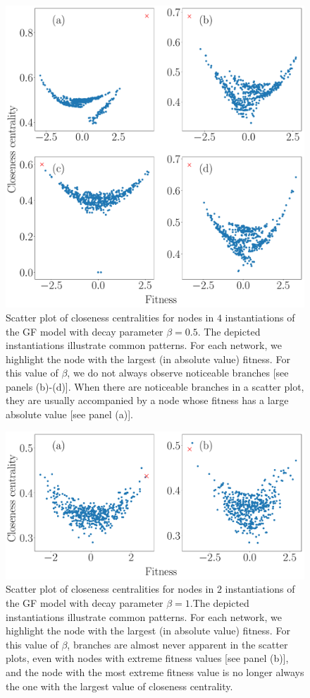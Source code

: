 \documentclass[%
 reprint,
 amsmath,amssymb,
 aps,
]{revtex4-1}
\begin{document}
\begin{figure}
    \centering
    \includegraphics[width=0.8\linewidth]{geographic_beta_05_examples_largerfont.pdf}
    \caption{Scatter plot of closeness centralities for nodes in $4$ instantiations of the GF model with decay parameter $\beta = 0.5$. The depicted instantiations illustrate common patterns. For each network, we highlight the node with the largest (in absolute value) fitness. For this value of $\beta$, we do not always observe noticeable branches [see panels (b)-(d)]. When there are noticeable branches in a scatter plot, they are usually accompanied by a node whose fitness has a large absolute value [see panel (a)].
    }
    \label{fig:closeness_example_2}
\end{figure}


\begin{figure}
    \centering
    \includegraphics[width=0.8\linewidth]{geographic_beta_10_examples_largerfont.pdf}
    \caption{Scatter plot of closeness centralities for nodes in $2$ instantiations of the GF model with decay parameter $\beta = 1$.The depicted instantiations illustrate common patterns. For each network, we highlight the node with the largest (in absolute value) fitness. For this value of $\beta$, branches are almost never apparent in the scatter plots, even with nodes with extreme fitness values [see panel (b)], and the node with the most extreme fitness value is no longer always the one with the largest value of closeness centrality.
    }
    \label{fig:closeness_example_3}
\end{figure}
\end{document}
